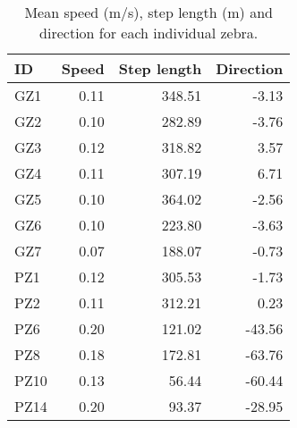 \begin{table}[H]
\centering
\caption[Movement summary of each individual, Laikipia]{Mean speed (m/s), step length (m) and direction 
               for each individual zebra.} 
\label{table:summary_zebras_KEN}
\begin{tabular}{lrrr}
  \hline
ID & Speed & Step length & Direction \\ 
  \hline
GZ1 & 0.11 & 348.51 & -3.13 \\ 
  GZ2 & 0.10 & 282.89 & -3.76 \\ 
  GZ3 & 0.12 & 318.82 & 3.57 \\ 
  GZ4 & 0.11 & 307.19 & 6.71 \\ 
  GZ5 & 0.10 & 364.02 & -2.56 \\ 
  GZ6 & 0.10 & 223.80 & -3.63 \\ 
  GZ7 & 0.07 & 188.07 & -0.73 \\ 
  PZ1 & 0.12 & 305.53 & -1.73 \\ 
  PZ2 & 0.11 & 312.21 & 0.23 \\ 
  PZ6 & 0.20 & 121.02 & -43.56 \\ 
  PZ8 & 0.18 & 172.81 & -63.76 \\ 
  PZ10 & 0.13 & 56.44 & -60.44 \\ 
  PZ14 & 0.20 & 93.37 & -28.95 \\ 
   \hline
\end{tabular}
\end{table}
